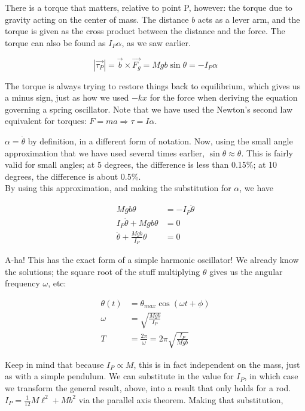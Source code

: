 \documentclass[8.01x]{subfiles}
\begin{document}
There is a torque that matters, relative to point P, however: the torque due to gravity acting on the center of mass. The distance $b$ acts as a lever arm, and the torque is given as the cross product between the distance and the force. The torque can also be found as $I_P \alpha$, as we saw earlier.

\begin{equation}
|\vec{\tau_P}| = \vec{b} \times \vec{F_g} = M g b \sin \theta = - I_P \alpha
\end{equation}

The torque is always trying to restore things back to equilibrium, which gives us a minus sign, just as how we used $- k x$ for the force when deriving the equation governing a spring oscillator. Note that we have used the Newton's second law equivalent for torques: $F = m a \Rightarrow \tau = I \alpha$.

$\alpha = \ddot{\theta}$ by definition, in a different form of notation. Now, using the small angle approximation that we have used several times earlier, $\sin \theta \approx \theta$. This is fairly valid for small angles; at 5 degrees, the difference is less than 0.15\%; at 10 degrees, the difference is about 0.5\%.\\
By using this approximation, and making the substitution for $\alpha$, we have

\begin{align}
M g b \theta &= - I_P \ddot{\theta}\\
I_P \ddot{\theta} + M g b \theta &= 0\\
\ddot{\theta} + \frac{M g b}{I_P} \theta &= 0
\end{align}

A-ha! This has the exact form of a simple harmonic oscillator! We already know the solutions; the square root of the stuff multiplying $\theta$ gives us the angular frequency $\omega$, etc:

\begin{align}
\theta(t) &= \theta_{max} \cos(\omega t + \phi)\\
\omega    &= \sqrt{\frac{M g b}{I_P}}\\
T         &= \frac{2 \pi}{\omega} = 2 \pi \sqrt{\frac{I_P}{M g b}}
\end{align}

Keep in mind that because $I_P \propto M$, this is in fact independent on the mass, just as with a simple pendulum. We can substitute in the value for $I_P$, in which case we transform the general result, above, into a result that only holds for a rod.\\
$I_P = \frac{1}{12} M \ell^2 + M b^2$ via the parallel axis theorem. Making that substitution,
\end{document}
